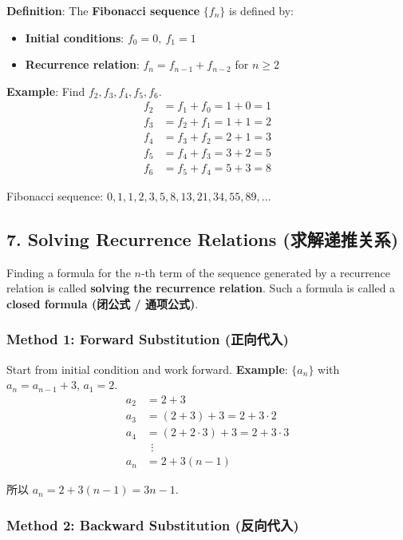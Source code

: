 \documentclass[10pt,a4paper,openany]{ctexbook}
\theoremstyle{definition}
\theoremstyle{remark}
\begin{document}
\textbf{Definition}: The \textbf{Fibonacci sequence} $\{f_n\}$ is defined by:
\begin{itemize}
\item \textbf{Initial conditions}: $f_0 = 0,\ f_1 = 1$
\item \textbf{Recurrence relation}: $f_n = f_{n-1} + f_{n-2}$ for $n \ge 2$

\end{itemize}

\textbf{Example}: Find $f_2, f_3, f_4, f_5, f_6$.
\[
\begin{aligned}
f_2 &= f_1 + f_0 = 1 + 0 = 1 \\
f_3 &= f_2 + f_1 = 1 + 1 = 2 \\
f_4 &= f_3 + f_2 = 2 + 1 = 3 \\
f_5 &= f_4 + f_3 = 3 + 2 = 5 \\
f_6 &= f_5 + f_4 = 5 + 3 = 8
\end{aligned}
\]

Fibonacci sequence: $0, 1, 1, 2, 3, 5, 8, 13, 21, 34, 55, 89, \dots$
\vspace{-2pt}

\subsection{7. Solving Recurrence Relations (求解递推关系)}

Finding a formula for the $n$-th term of the sequence generated by a recurrence relation is called \textbf{solving the recurrence relation}. Such a formula is called a \textbf{closed formula (闭公式 / 通项公式)}.
\subsubsection{Method 1: Forward Substitution (正向代入)}

Start from initial condition and work forward.
\textbf{Example}: $\{a_n\}$ with $a_n = a_{n-1} + 3$, $a_1 = 2$.
\[
\begin{aligned}
a_2 &= 2 + 3 \\
a_3 &= (2 + 3) + 3 = 2 + 3 \cdot 2 \\
a_4 &= (2 + 2 \cdot 3) + 3 = 2 + 3 \cdot 3 \\
&\ \ \vdots \\
a_n &= 2 + 3(n - 1)
\end{aligned}
\]

所以 $a_n = 2 + 3(n-1) = 3n - 1$.
\subsubsection{Method 2: Backward Substitution (反向代入)}
\end{document}
